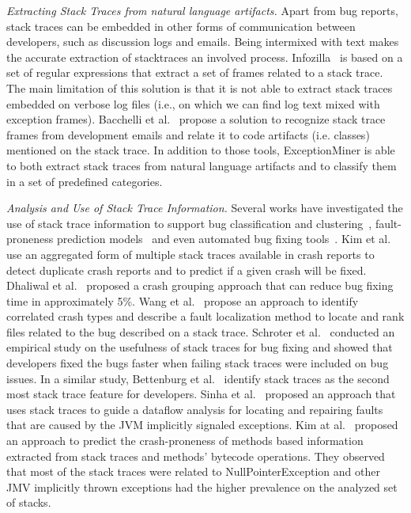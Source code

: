 \documentclass[conference]{IEEEtran}
\begin{document}
\textit{Extracting Stack Traces from natural language artifacts.} 
Apart from bug reports, stack traces can be embedded in other forms of
communication between developers, such as discussion logs and emails.
Being intermixed with text makes the accurate extraction of stacktraces 
an involved process.
Infozilla~\cite{bettenburg2008extracting}
is based on a set of regular expressions that extract a set of frames
related to a stack trace. The main limitation of this solution is that it is not
able to extract stack traces embedded on verbose log files (i.e., on which we
can find log text mixed with exception frames). Bacchelli
et al.~\cite{bacchelli2012content} propose a solution to recognize stack trace frames
from development emails and relate it to code artifacts (i.e. classes) mentioned
on the stack trace. In addition to those tools, ExceptionMiner is able to 
both extract stack traces from natural language artifacts and to 
classify them in a set of predefined categories.

\textit{Analysis and Use of Stack Trace Information.} Several works have
investigated the use of stack trace information to support bug classification
and clustering~\cite{wang2013improving, kim2011crash, dhaliwal2011classifying},
fault-proneness prediction models~\cite{kim2013predicting} and even automated
bug fixing tools~\cite{sinha2009fault}. Kim et al.~\cite{kim2011crash} use an
aggregated form of multiple stack traces available in crash reports to detect
duplicate crash reports and to predict if a given crash will be fixed. Dhaliwal
et al.~\cite{dhaliwal2011classifying} proposed a crash grouping approach that
can reduce bug fixing time in approximately 5\%. Wang et
al.~\cite{wang2013improving} propose an approach to identify correlated crash
types and describe a fault localization method to locate and rank files related
to the bug described on a stack trace. Schroter et al.~\cite{schroter2010stack}
conducted an empirical study on the usefulness of stack traces for bug fixing
and showed that developers fixed the bugs faster when failing stack traces were
included on bug issues.  In a similar study, Bettenburg et
al.~\cite{bettenburg2008makes} identify stack traces as the second most stack
trace feature for developers.  Sinha et al.~\cite{sinha2009fault} proposed an
approach that uses stack traces to guide a dataflow analysis for locating and
repairing faults that are caused by the JVM implicitly signaled exceptions. Kim
at al.~\cite{kim2013predicting} proposed an approach to predict the
crash-proneness of methods based information extracted from stack traces and
methods' bytecode operations.  They observed that most of the stack traces were
related to NullPointerException and other JMV implicitly thrown exceptions had
the higher prevalence on the analyzed set of stacks.
\end{document}
